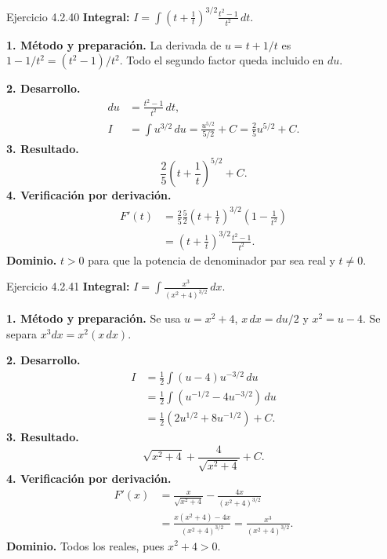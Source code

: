 \begin{examplebox}{Ejercicio 4.2.40}
\textbf{Integral:} $\displaystyle I=\int \left(t+\frac1t\right)^{3/2}\frac{t^2-1}{t^2}\,dt$.

\textbf{1. Método y preparación.} La derivada de $u=t+1/t$ es $1-1/t^2=(t^2-1)/t^2$. Todo el segundo factor queda incluido en $du$.

\textbf{2. Desarrollo.}
\begin{align*}
du&=\frac{t^2-1}{t^2}\,dt,\\I&=\int u^{3/2}\,du=\frac{u^{5/2}}{5/2}+C=\frac25u^{5/2}+C.
\end{align*}
\textbf{3. Resultado.}
\[
\frac25\left(t+\frac1t\right)^{5/2}+C.
\]
\textbf{4. Verificación por derivación.}
\begin{align*}
F'(t)&=\frac25\frac52\left(t+\frac1t\right)^{3/2}\left(1-\frac1{t^2}\right)\\&=\left(t+\frac1t\right)^{3/2}\frac{t^2-1}{t^2}.
\end{align*}
\textbf{Dominio.} $t>0$ para que la potencia de denominador par sea real y $t\ne0$.
\end{examplebox}

\begin{examplebox}{Ejercicio 4.2.41}
\textbf{Integral:} $\displaystyle I=\int \frac{x^3}{(x^2+4)^{3/2}}\,dx$.

\textbf{1. Método y preparación.} Se usa $u=x^2+4$, $x\,dx=du/2$ y $x^2=u-4$. Se separa $x^3dx=x^2(x\,dx)$.

\textbf{2. Desarrollo.}
\begin{align*}
I&=\frac12\int(u-4)u^{-3/2}\,du\\&=\frac12\int(u^{-1/2}-4u^{-3/2})\,du\\&=\frac12\left(2u^{1/2}+8u^{-1/2}\right)+C.
\end{align*}
\textbf{3. Resultado.}
\[
\sqrt{x^2+4}+\frac4{\sqrt{x^2+4}}+C.
\]
\textbf{4. Verificación por derivación.}
\begin{align*}
F'(x)&=\frac{x}{\sqrt{x^2+4}}-\frac{4x}{(x^2+4)^{3/2}}\\&=\frac{x(x^2+4)-4x}{(x^2+4)^{3/2}}=\frac{x^3}{(x^2+4)^{3/2}}.
\end{align*}
\textbf{Dominio.} Todos los reales, pues $x^2+4>0$.
\end{examplebox}

